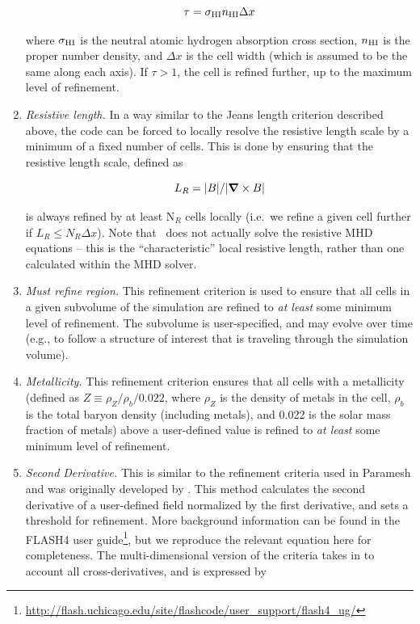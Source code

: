 \begin{enumerate}
\begin{equation}
\tau = \sigma_{\rm HI} n_{\rm HI} \Delta x 
\end{equation}

where $\sigma_{\rm HI}$ is the neutral atomic hydrogen absorption
cross section, $n_{\rm HI}$ is the proper  number density,
and $\Delta x$ is the cell width (which is assumed to be the same
along each axis).  If $\tau > 1$, the cell is refined further, up to
the maximum level of refinement.

\item{\em Resistive length.}  In a way similar to the Jeans length
  criterion described above, the code can be forced to locally resolve
  the resistive length scale by a minimum of a fixed number of cells.
  This is done by ensuring that the resistive length scale, defined as

\begin{equation}
L_R = |B| / |\curl B|
\end{equation}

is always refined by at least N$_R$ cells locally (i.e.~we refine a
given cell further if $L_R \leq N_R \Delta x$).  Note that \enzo\ does
not actually solve the resistive MHD equations -- this is the
``characteristic'' local resistive length, rather than one calculated
within the MHD solver.

\item{\em Must refine region.}  This refinement criterion is used to
  ensure that all cells in a given subvolume of the simulation are
  refined to {\it at least} some minimum level of refinement.  The
  subvolume is user-specified, and may evolve over time (e.g., to
  follow a structure of interest that is traveling through the
  simulation volume).

\item{\em Metallicity.}  This refinement criterion ensures that all
  cells with a metallicity (defined as $Z \equiv \rho_{Z} / \rho_{b} /
  0.022$, where $\rho_{Z}$ is the density of metals in the cell,
  $\rho_{b}$ is the total baryon density (including metals), and 0.022
  is the solar mass fraction of metals) above a user-defined value is
  refined to {\it at least} some minimum level of refinement. 

\item{\em Second Derivative.}  This is similar to the refinement criteria used
  in Paramesh and was originally developed by \cite{1987nasa.reptQ....L}.  This
  method calculates the second derivative of a user-defined field normalized by
  the first derivative, and sets a threshold for refinement.  More background
  information can be found in the FLASH4 user guide\footnote{\url{http://flash.uchicago.edu/site/flashcode/user\_support/flash4\_ug/}},
  but we reproduce the relevant equation here for completeness. The
  multi-dimensional version of the criteria takes in to account all
  cross-derivatives, and is expressed by


\end{enumerate}
